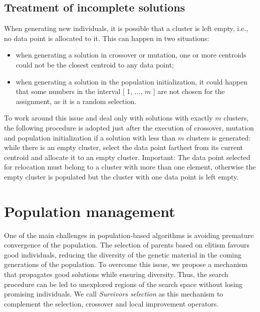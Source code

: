 \subsection{Treatment of incomplete solutions}
When generating new individuals, it is possible that a cluster is left empty, i.e., no data point is allocated to it. This can happen in two situations: 

\begin{itemize}
	
	\item when generating a solution in crossover or mutation, one or more centroids could not be the closest centroid to any data point;

	\item when generating a solution in the population initialization, it could happen that some numbers in the interval [ 1, ..., $m$ ] are not chosen for the assignment, as it is a random selection.
	
\end{itemize}

To work around this issue and deal only with solutions with exactly $m$ clusters, the following procedure is adopted just after the execution of crossover, mutation and population initialization if a solution with less than $m$ clusters is generated: while there is an empty cluster, select the data point farthest from its current centroid and allocate it to an empty cluster. Important: The data point selected for relocation must belong to a cluster with more than one element, otherwise the empty cluster is populated but the cluster with one data point is left empty.

\section{Population management}
\label{sec:population-management}
One of the main challenges in population-based algorithms is avoiding premature convergence of the population. The selection of parents based on elitism favours good individuals, reducing the diversity of the genetic material in the coming generations of the population. To overcome this issue, we propose a mechanism that propagates good solutions while ensuring diversity. Thus, the search procedure can be led to unexplored regions of the search space without losing promising individuals. We call \textit{Survivors selection} as this mechanism to complement the selection, crossover and local improvement operators.


